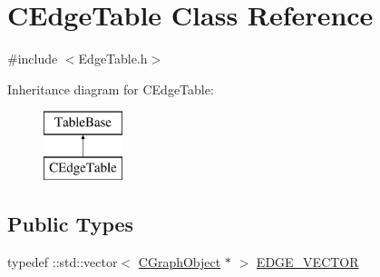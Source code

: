\hypertarget{class_c_edge_table}{}\section{C\+Edge\+Table Class Reference}
\label{class_c_edge_table}


{\ttfamily \#include $<$Edge\+Table.\+h$>$}

Inheritance diagram for C\+Edge\+Table\+:\begin{figure}[H]
\begin{center}
\leavevmode
\includegraphics[height=2.000000cm]{class_c_edge_table}
\end{center}
\end{figure}
\subsection*{Public Types}
\begin{DoxyCompactItemize}
\item 
typedef \+::std\+::vector$<$ \hyperlink{class_c_graph_object}{C\+Graph\+Object} $\ast$ $>$ \hyperlink{class_c_edge_table_afca2c9fb1e836c43a088a62c6fc369eb}{E\+D\+G\+E\+\_\+\+V\+E\+C\+T\+O\+R}
\end{DoxyCompactItemize}
